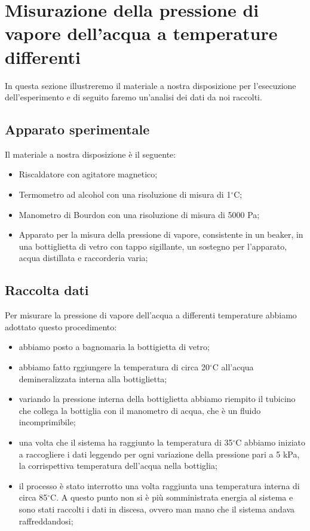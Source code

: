 \section{Misurazione della pressione di vapore dell'acqua a temperature differenti}

In questa sezione illustreremo il materiale a nostra disposizione per l'esecuzione
dell'esperimento e di seguito faremo un'analisi dei dati da noi raccolti.

\subsection{Apparato sperimentale}

Il materiale a nostra disposizione è il seguente:
\begin{itemize}
	\item{Riscaldatore con agitatore magnetico;}
	\item{Termometro ad alcohol con una risoluzione di misura di 1$^\circ$C;}
	\item{Manometro di Bourdon con una risoluzione di misura di 5000 Pa;}
	\item{Apparato per la misura della pressione di vapore, consistente in un beaker,
    in una bottiglietta di vetro con tappo sigillante, un sostegno per l'apparato, acqua distillata e raccorderia varia;}
\end{itemize}

\subsection{Raccolta dati}

Per misurare la pressione di vapore dell'acqua a differenti temperature abbiamo adottato questo procedimento:

\begin{itemize}
	\item{abbiamo posto a bagnomaria la bottigietta di vetro;}
	\item{abbiamo fatto rggiungere la temperatura di circa 20$^\circ$C all'acqua demineralizzata interna alla bottiglietta;}
	\item{variando la pressione interna della bottiglietta abbiamo riempito il
        tubicino che collega la bottiglia con il manometro di acqua, che è un fluido incomprimibile;}
	\item{una volta che il sistema ha raggiunto la temperatura di 35$^\circ$C abbiamo
        iniziato a raccogliere i dati leggendo per ogni variazione della pressione pari
        a 5 kPa, la corrispettiva temperatura dell'acqua nella bottiglia;}
	\item{il processo è stato interrotto una volta raggiunta una temperatura interna di
        circa 85$^\circ$C. A questo punto non si è più somministrata energia al sistema e sono
        stati raccolti i dati in discesa, ovvero man mano che il sistema andava raffreddandosi;}
\end{itemize}


